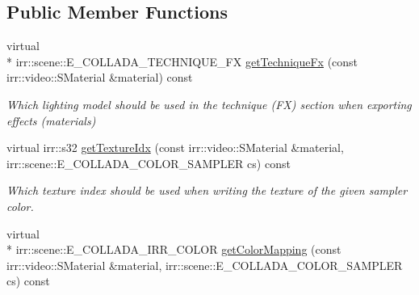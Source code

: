 \subsection*{Public Member Functions}
\begin{DoxyCompactItemize}
\item 
\hypertarget{classirr_1_1scene_1_1_c_collada_mesh_writer_properties_af1848e6467e716e21a68fccefbe3f136}{virtual \\*
irr\-::scene\-::\-E\-\_\-\-C\-O\-L\-L\-A\-D\-A\-\_\-\-T\-E\-C\-H\-N\-I\-Q\-U\-E\-\_\-\-F\-X \hyperlink{classirr_1_1scene_1_1_c_collada_mesh_writer_properties_af1848e6467e716e21a68fccefbe3f136}{get\-Technique\-Fx} (const irr\-::video\-::\-S\-Material \&material) const }\label{classirr_1_1scene_1_1_c_collada_mesh_writer_properties_af1848e6467e716e21a68fccefbe3f136}

\begin{DoxyCompactList}\small\item\em Which lighting model should be used in the technique (F\-X) section when exporting effects (materials) \end{DoxyCompactList}\item 
\hypertarget{classirr_1_1scene_1_1_c_collada_mesh_writer_properties_a4e485a65a9687e9bce76c2b7783faa65}{virtual irr\-::s32 \hyperlink{classirr_1_1scene_1_1_c_collada_mesh_writer_properties_a4e485a65a9687e9bce76c2b7783faa65}{get\-Texture\-Idx} (const irr\-::video\-::\-S\-Material \&material, irr\-::scene\-::\-E\-\_\-\-C\-O\-L\-L\-A\-D\-A\-\_\-\-C\-O\-L\-O\-R\-\_\-\-S\-A\-M\-P\-L\-E\-R cs) const }\label{classirr_1_1scene_1_1_c_collada_mesh_writer_properties_a4e485a65a9687e9bce76c2b7783faa65}

\begin{DoxyCompactList}\small\item\em Which texture index should be used when writing the texture of the given sampler color. \end{DoxyCompactList}\item 
\hypertarget{classirr_1_1scene_1_1_c_collada_mesh_writer_properties_a0de4bbdd8ea2a4bb6cb1f77addc022b4}{virtual \\*
irr\-::scene\-::\-E\-\_\-\-C\-O\-L\-L\-A\-D\-A\-\_\-\-I\-R\-R\-\_\-\-C\-O\-L\-O\-R \hyperlink{classirr_1_1scene_1_1_c_collada_mesh_writer_properties_a0de4bbdd8ea2a4bb6cb1f77addc022b4}{get\-Color\-Mapping} (const irr\-::video\-::\-S\-Material \&material, irr\-::scene\-::\-E\-\_\-\-C\-O\-L\-L\-A\-D\-A\-\_\-\-C\-O\-L\-O\-R\-\_\-\-S\-A\-M\-P\-L\-E\-R cs) const }\label{classirr_1_1scene_1_1_c_collada_mesh_writer_properties_a0de4bbdd8ea2a4bb6cb1f77addc022b4}


\end{DoxyCompactItemize}
